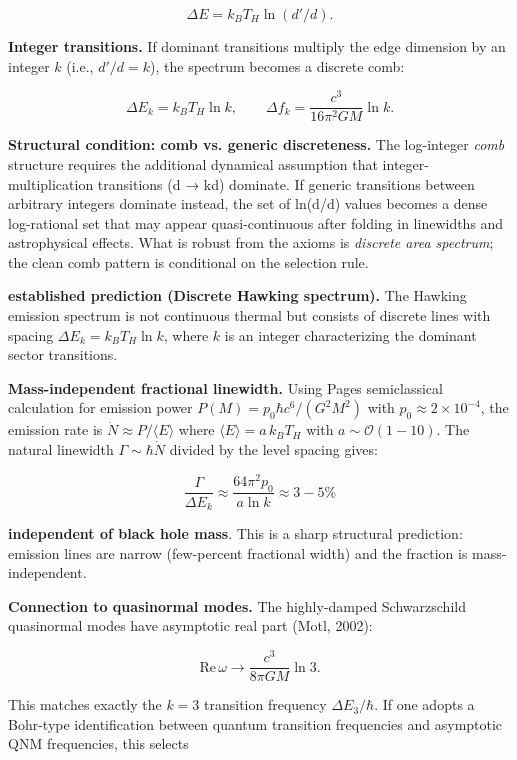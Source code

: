 \[
\Delta E = k_B T_H \ln(d'/d).
\]

\textbf{Integer transitions.} If dominant transitions multiply the edge dimension by an integer \(k\) (i.e., \(d'/d = k\)), the spectrum becomes a discrete comb:

\[
\Delta E_k = k_B T_H \ln k, \qquad
\Delta f_k = \frac{c^3}{16\pi^2 G M} \ln k.
\]

\textbf{Structural condition: comb vs. generic discreteness.} The log-integer \emph{comb} structure requires the additional dynamical assumption that integer-multiplication transitions (d → kd) dominate. If generic transitions between arbitrary integers dominate instead, the set of ln(d\textquotesingle/d) values becomes a dense log-rational set that may appear quasi-continuous after folding in linewidths and astrophysical effects. What is robust from the axioms is \emph{discrete area spectrum}; the clean comb pattern is conditional on the selection rule.

\textbf{established prediction (Discrete Hawking spectrum).} The Hawking emission spectrum is not continuous thermal but consists of discrete lines with spacing \(\Delta E_k = k_B T_H \ln k\), where \(k\) is an integer characterizing the dominant sector transitions.

\textbf{Mass-independent fractional linewidth.} Using Page\textquotesingle s semiclassical calculation for emission power \(P(M) = p_0 \hbar c^6 / (G^2 M^2)\) with \(p_0 \approx 2 \times 10^{-4}\), the emission rate is \(\dot{N} \approx P /
\langle E \rangle\) where \(\langle E \rangle = a \, k_B T_H\) with \(a \sim
\mathcal{O}(1-10)\). The natural linewidth \(\Gamma \sim \hbar \dot{N}\) divided by the level spacing gives:

\[
\frac{\Gamma}{\Delta E_k} \approx \frac{64\pi^2 p_0}{a \ln k} \approx 3-5\%
\]

\textbf{independent of black hole mass}. This is a sharp structural prediction: emission lines are narrow (few-percent fractional width) and the fraction is mass-independent.

\textbf{Connection to quasinormal modes.} The highly-damped Schwarzschild quasinormal modes have asymptotic real part (Motl, 2002):

\[
\mathrm{Re}\,\omega \to \frac{c^3}{8\pi G M} \ln 3.
\]

This matches exactly the \(k = 3\) transition frequency \(\Delta E_3 / \hbar\). If one adopts a Bohr-type identification between quantum transition frequencies and asymptotic QNM frequencies, this selects

